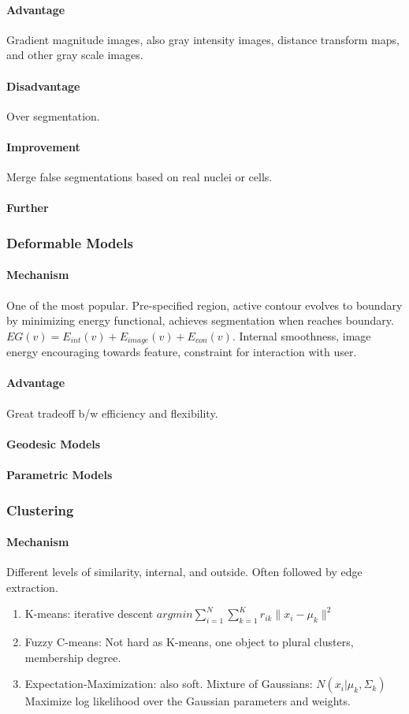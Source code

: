 \documentclass[10pt,a4paper]{article}
\begin{document}
\paragraph{Advantage}
Gradient magnitude images, also gray intensity images, distance transform maps, and other gray scale images.
\paragraph{Disadvantage}
Over segmentation.
\paragraph{Improvement}
Merge false segmentations based on real nuclei or cells.
\paragraph{Further}

\subsubsection{Deformable Models}
\paragraph{Mechanism}
One of the most popular. Pre-specified region, active contour evolves to boundary by minimizing energy functional, achieves segmentation when reaches boundary. $EG(v)=E_{int}(v)+E_{image}(v)+E_{con}(v)$. Internal smoothness, image energy encouraging towards feature, constraint for interaction with user.
\paragraph{Advantage}
Great tradeoff b/w efficiency and flexibility. 
\paragraph{Geodesic Models}
\paragraph{Parametric Models}

\subsubsection{Clustering}
\paragraph{Mechanism}
Different levels of similarity, internal, and outside.  Often followed by edge extraction.
\begin{enumerate}
	\item K-means: iterative descent $argmin\sum_{i=1}^{N}\sum_{k=1}^{K}r_{ik}\|x_i-\mu_k\|^2$
	\item Fuzzy C-means: Not hard as K-means, one object to plural clusters, membership degree.
	\item Expectation-Maximization: also soft. Mixture of Gaussians: $N(x_i|\mu_k,\Sigma_k)$ Maximize log likelihood over the Gaussian parameters and weights.
\end{enumerate}
\end{document}
